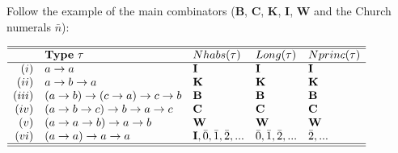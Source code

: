 \documentclass[a4paper,10pt]{article}
\begin{document}
\begin{exa}
Follow the example of the main combinators (\textbf{B}, \textbf{C}, \textbf{K}, \textbf{I}, \textbf{W} and the Church numerals $\bar{n}$):

\begin{center}
$
 \begin{array}{rlllll}\hline\hline
 & \mbox{\textbf{Type} } \tau             & Nhabs(\tau)         & Long(\tau)        & Nprinc(\tau)       \\\hline
 (i) & a\to a                                 & \mbox{\textbf{I}}   & \mbox{\textbf{I}} & \mbox{\textbf{I}} \\
 (ii) & a\to b\to a                            & \mbox{\textbf{K}}   & \mbox{\textbf{K}} & \mbox{\textbf{K}} \\
 (iii) & (a\to b)\to (c \to a) \to c \to b       & \mbox{\textbf{B}}   & \mbox{\textbf{B}} & \mbox{\textbf{B}} \\
 (iv) & (a\to b\to c)\to b\to a\to c            & \mbox{\textbf{C}}   & \mbox{\textbf{C}} & \mbox{\textbf{C}} \\
 (v) & (a\to a\to b)\to a\to b                 & \mbox{\textbf{W}}   & \mbox{\textbf{W}} & \mbox{\textbf{W}} \\
 (vi) & (a\to a) \to a \to a                    & \mbox{\textbf{I}}, \bar{0}, \bar{1}, \bar{2}, ... & \bar{0}, \bar{1}, \bar{2}, ... &\bar{2}, ... 
  \\\hline\hline
 \end{array}
$
\vspace*{0.5cm}


\end{center}
\end{exa}
\end{document}
